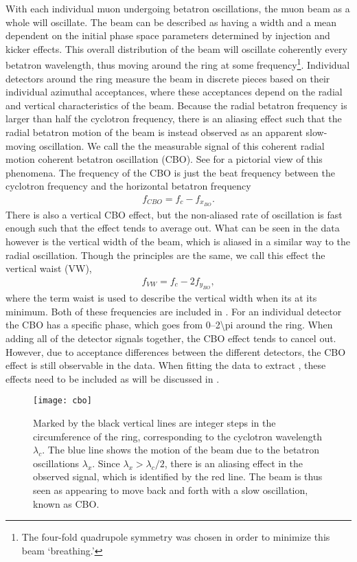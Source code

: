 With each individual muon undergoing betatron oscillations, the muon beam as a whole will oscillate. The beam can be described as having a width and a mean dependent on the initial phase space parameters determined by injection and kicker effects. This overall distribution of the beam will oscillate coherently every betatron wavelength, thus moving around the ring at some frequency\footnote{The four-fold quadrupole symmetry was chosen in order to minimize this beam `breathing.'}. Individual detectors around the ring measure the beam in discrete pieces based on their individual azimuthal acceptances, where these acceptances depend on the radial and vertical characteristics of the beam. Because the radial betatron frequency is larger than half the cyclotron frequency, there is an aliasing effect such that the radial betatron motion of the beam is instead observed as an apparent slow-moving oscillation. We call the the measurable signal of this coherent radial motion coherent betatron oscillation (CBO). See  for a pictorial view of this phenomena. The frequency of the CBO is just the beat frequency between the cyclotron frequency and the horizontal betatron frequency
        \begin{align}
            f_{CBO} = f_{c}-f_{x_{BO}}.
        \end{align}
There is also a vertical CBO effect, but the non-aliased rate of oscillation is fast enough such that the effect tends to average out. What can be seen in the data however is the vertical width of the beam, which is aliased in a similar way to the radial oscillation. Though the principles are the same, we call this effect the vertical waist (VW),
        \begin{align}
            f_{VW} = f_{c}-2f_{y_{BO}},
        \end{align}
where the term waist is used to describe the vertical width when its at its minimum. Both of these frequencies are included in . For an individual detector the CBO has a specific phase, which goes from \SIrange{0}{2\pi}{} around the ring. When adding all of the detector signals together, the CBO effect tends to cancel out. However, due to acceptance differences between the different detectors, the CBO effect is still observable in the data. When fitting the data to extract \wa, these effects need to be included as will be discussed in .

\begin{figure}[]
    \centering
    \texttt{[image: cbo]}
    \caption[Coherent betatron oscillation]{Marked by the black vertical lines are integer steps in the circumference of the ring, corresponding to the cyclotron wavelength $\lambda_{c}$. The blue line shows the motion of the beam due to the betatron oscillations $\lambda_{x}$. Since $\lambda_{x} > \lambda_{c}/2$, there is an aliasing effect in the observed signal, which is identified by the red line. The beam is thus seen as appearing to move back and forth with a slow oscillation, known as CBO.}
    \label{fig:cbo}
\end{figure}


